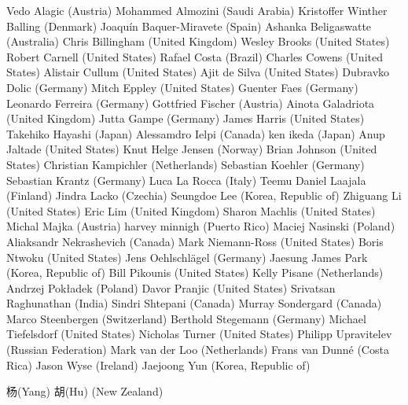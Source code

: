 Vedo Alagic (Austria)
Mohammed Almozini (Saudi Arabia)
Kristoffer Winther Balling (Denmark)
Joaquín Baquer-Miravete (Spain)
Ashanka Beligaswatte (Australia)
Chris Billingham (United Kingdom)
Wesley Brooks (United States)
Robert Carnell (United States)
Rafael Costa (Brazil)
Charles Cowens (United States)
Alistair Cullum (United States)
Ajit de Silva (United States)
Dubravko Dolic (Germany)
Mitch Eppley (United States)
Guenter Faes (Germany)
Leonardo Ferreira (Germany)
Gottfried Fischer (Austria)
Ainota Galadriota (United Kingdom)
Jutta Gampe (Germany)
James Harris (United States)
Takehiko Hayashi (Japan)
Alessamdro Ielpi (Canada)
ken ikeda (Japan)
Anup Jaltade (United States)
Knut Helge Jensen (Norway)
Brian Johnson (United States)
Christian Kampichler (Netherlands)
Sebastian Koehler (Germany)
Sebastian Krantz (Germany)
Luca La Rocca (Italy)
Teemu Daniel Laajala (Finland)
Jindra Lacko (Czechia)
Seungdoe Lee (Korea, Republic of)
Zhiguang Li (United States)
Eric Lim (United Kingdom)
Sharon Machlis (United States)
Michal Majka (Austria)
harvey minnigh (Puerto Rico)
Maciej Nasinski (Poland)
Aliaksandr Nekrashevich (Canada)
Mark Niemann-Ross (United States)
Boris Ntwoku (United States)
Jens Oehlschlägel (Germany)
Jaesung James Park (Korea, Republic of)
Bill Pikounis (United States)
Kelly Pisane (Netherlands)
Andrzej Pokładek (Poland)
Davor Pranjic (United States)
Srivatsan Raghunathan (India)
Sindri Shtepani (Canada)
Murray Sondergard (Canada)
Marco Steenbergen (Switzerland)
Berthold Stegemann (Germany)
Michael Tiefelsdorf (United States)
Nicholas Turner (United States)
Philipp Upravitelev (Russian Federation)
Mark van der Loo (Netherlands)
Frans van Dunné (Costa Rica)
Jason Wyse (Ireland)
Jaejoong Yun (Korea, Republic of)
\begin{CJK*}{UTF8}{gbsn} 
杨(Yang) 胡(Hu) (New Zealand)  \end{CJK*}




\address{Torsten Hothorn \\
  Universit\"at Z\"urich, Switzerland}
